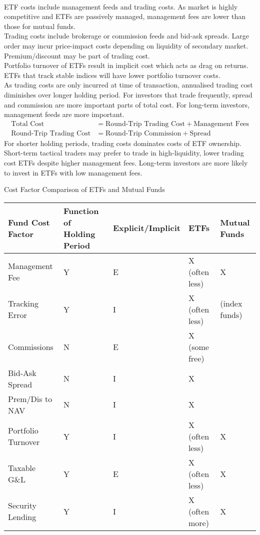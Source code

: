 \begin{remark} \\
ETF	costs include management feeds and trading costs. As market is highly competitive and ETFs are passively managed, management fees are lower than those for mutual funds.\\
Trading costs include brokerage or commission feeds and bid-ask spreads. Large order may incur price-impact costs depending on liquidity of secondary market. Premium/discount may be part of trading cost.\\
Portfolio turnover of ETFs result in implicit cost which acts as drag on returns. ETFs that track stable indices will have lower portfolio turnover costs.\\
As trading costs are only incurred at time of transaction, annualised trading cost diminishes over longer holding period. For investors that trade frequently, spread and commission are more important parts of total cost. For long-term investors, management feeds are more important.
\begin{align}
\text{Total Cost} &= \text{Round-Trip Trading Cost} + \text{Management Fees} \nonumber \\
\text{Round-Trip Trading Cost} &= \text{Round-Trip Commission} + \text{Spread} \nonumber
\end{align}
For shorter holding periods, trading costs dominates costs of ETF ownership. Short-term tactical traders may prefer to trade in high-liquidity, lower trading cost ETFs despite higher management fees. Long-term investors are more likely to invest in ETFs with low management fees.
\end{remark}

\begin{flushleft}
Cost Factor Comparison of ETFs and Mutual Funds
\begin{tabularx}{\textwidth}{p{10em}|p{12em}|p{7em}|X|X}
\hline
\rowcolor{gray!30}
Fund Cost Factor & Function of Holding Period & Explicit/Implicit & ETFs & Mutual Funds \\
\hline
Management Fee & Y & E & X (often less) & X \\
Tracking Error & Y & I & X (often less) & (index funds) \\
Commissions & N & E & X (some free) & \\
Bid-Ask Spread & N & I & X & \\
Prem/Dis to NAV & N & I & X & \\
Portfolio Turnover & Y & I & X (often less) & X \\
Taxable G\&L & Y & E & X (often less) & X \\
Security Lending & Y & I & X (often more) & X \\
\hline
\end{tabularx}
\end{flushleft}

